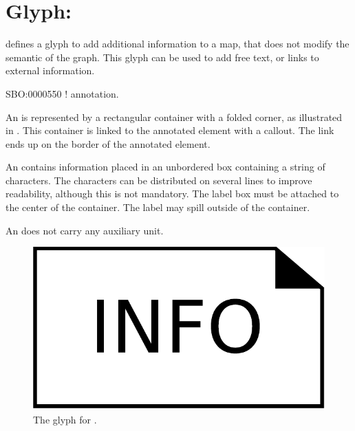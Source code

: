 
\section{Glyph: }
\label{sec:annotation}

\SBGNERLone defines a glyph to add additional information to a map, that does not modify the semantic of the graph. This glyph can be used to add free text, or links to external information.

\begin{glyphDescription}

\glyphSboTerm SBO:0000550 ! annotation.

\glyphContainer An  is represented by a rectangular container with a folded corner, as illustrated in . This container is linked to the annotated element with a callout. The link ends up on the border of the annotated element.

\glyphLabel An  contains information placed in an unbordered box containing a string of characters.  The characters can be distributed on several lines to improve readability, although this is not mandatory.  The label box must be attached to the center of the container. The label may spill outside of the container. 

\glyphAux An  does not carry any auxiliary unit.
\end{glyphDescription}

\begin{figure}[H]
  \centering
  \includegraphics[scale = 0.3]{images/annotation}
  \caption{The \ER glyph for .}
  \label{fig:annotation}
\end{figure}

